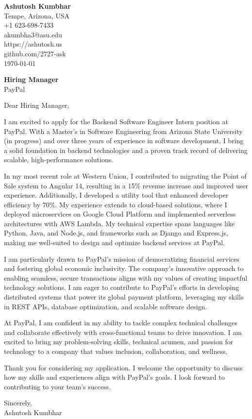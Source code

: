\documentclass[11pt]{article}
\begin{document}
\begin{flushleft}
\textbf{Ashutosh Kumbhar} \\
Tempe, Arizona, USA \\
+1 623-698-7433 \\
akumbha3@asu.edu \\
https://ashutosh.us \\
github.com/2727-ask \\
\today
\end{flushleft}

\vspace{0.5em}

\textbf{Hiring Manager} \\
PayPal \\

\vspace{1em}

Dear Hiring Manager, 

I am excited to apply for the Backend Software Engineer Intern position at PayPal. With a Master's in Software Engineering from Arizona State University (in progress) and over three years of experience in software development, I bring a solid foundation in backend technologies and a proven track record of delivering scalable, high-performance solutions.

In my most recent role at Western Union, I contributed to migrating the Point of Sale system to Angular 14, resulting in a 15\% revenue increase and improved user experience. Additionally, I developed a utility tool that enhanced developer efficiency by 70\%. My experience extends to cloud-based solutions, where I deployed microservices on Google Cloud Platform and implemented serverless architectures with AWS Lambda. My technical expertise spans languages like Python, Java, and Node.js, and frameworks such as Django and Express.js, making me well-suited to design and optimize backend services at PayPal.

I am particularly drawn to PayPal's mission of democratizing financial services and fostering global economic inclusivity. The company's innovative approach to enabling seamless, secure transactions aligns with my values of creating impactful technology solutions. I am eager to contribute to PayPal's efforts in developing distributed systems that power its global payment platform, leveraging my skills in REST APIs, database optimization, and scalable software design.

At PayPal, I am confident in my ability to tackle complex technical challenges and collaborate effectively with cross-functional teams to drive innovation. I am excited to bring my problem-solving skills, technical acumen, and passion for technology to a company that values inclusion, collaboration, and wellness.

Thank you for considering my application. I welcome the opportunity to discuss how my skills and experiences align with PayPal's goals. I look forward to contributing to your team’s success.

Sincerely, \\
Ashutosh Kumbhar
\end{document}
